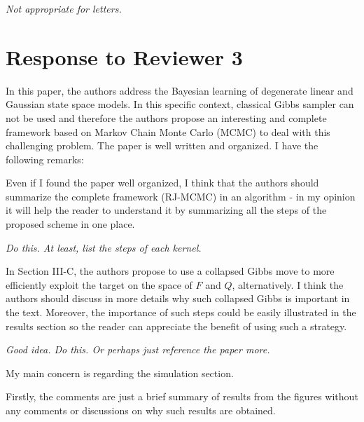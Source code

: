 \documentclass{article}
\newenvironment{review}[0]{\begin{itshape}\color{Gray}\noindent}{\end{itshape}\vspace{0.4cm}}
\newenvironment{response}[0]{\noindent}{\vspace{0.4cm}}
\newcommand{\meta}[1]{{\color{red}\em #1}}
\begin{document}
\begin{response}
 \meta{Not appropriate for letters.}
\end{response}


\section*{Response to Reviewer 3}

\begin{review}
In this paper, the authors address the Bayesian learning of degenerate linear and Gaussian state space models. In this specific context, classical Gibbs sampler can not be used and therefore the authors propose an interesting and complete framework based on Markov Chain Monte Carlo (MCMC) to deal with this challenging problem. The paper is well written and organized. I have the following remarks:

Even if I found the paper well organized, I think that the authors should summarize the complete framework (RJ-MCMC) in an algorithm - in my opinion it will help the reader to understand it by summarizing all the steps of the proposed scheme in one place.
\end{review}

\begin{response}
 \meta{Do this. At least, list the steps of each kernel.}
\end{response}

\begin{review}
In Section III-C, the authors propose to use a collapsed Gibbs move to more efficiently exploit the target on the space of $F$ and $Q$, alternatively. I think the authors should discuss in more details why such collapsed Gibbs is important in the text. Moreover, the importance of such steps could be easily illustrated in the results section so the reader can appreciate the benefit of using such a strategy.
\end{review}

\begin{response}
 \meta{Good idea. Do this. Or perhaps just reference the paper more.}
\end{response}

\begin{review}
My main concern is regarding the simulation section.

Firstly, the comments are just a brief summary of results from the figures without any comments or discussions on why such results are obtained.
\end{review}
\end{document}
